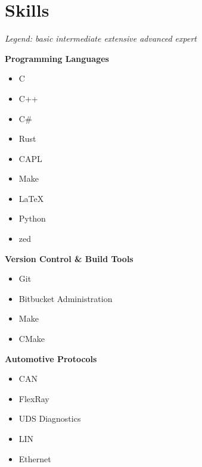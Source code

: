 \section*{Skills}

{\small\textit{Legend:  basic \quad {} intermediate \quad {} extensive \quad {} advanced \quad {} expert}}

\vspace{0.75em}

\begin{minipage}[t]{0.48\textwidth}
\textbf{Programming Languages}
\begin{itemize}[leftmargin=*,noitemsep,topsep=0pt]
    \item C 
    \item C++ 
    \item C\# 
    \item Rust 
    \item CAPL 
    \item Make 
    \item \LaTeX {}
    \item Python 
    \item zed 
\end{itemize}

\vspace{0.5em}

\textbf{Version Control \& Build Tools}
\begin{itemize}[leftmargin=*,noitemsep,topsep=0pt]
    \item Git 
    \item Bitbucket Administration 
    \item Make 
    \item CMake 
\end{itemize}

\vspace{0.5em}

\textbf{Automotive Protocols}
\begin{itemize}[leftmargin=*,noitemsep,topsep=0pt]
    \item CAN 
    \item FlexRay 
    \item UDS Diagnostics 
    \item LIN 
    \item Ethernet 
\end{itemize}


\end{minipage}
